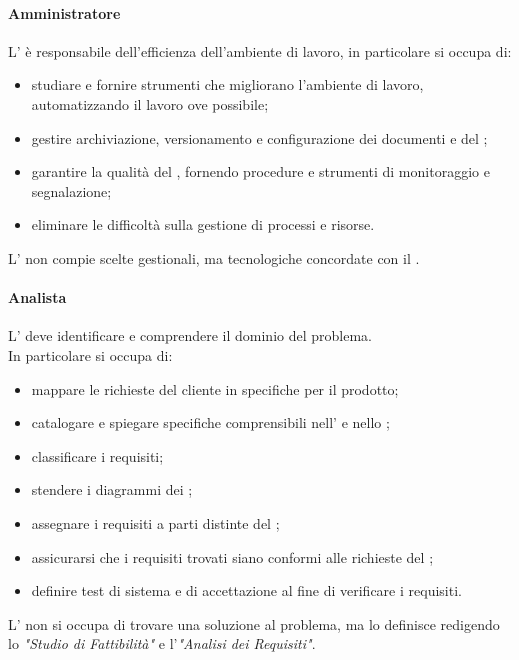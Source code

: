  \paragraph{Amministratore}
 L'\AMM{} è responsabile dell'efficienza dell'ambiente di lavoro, in particolare si occupa di:
 \begin{itemize}
  \item studiare e fornire strumenti che migliorano l'ambiente di lavoro, automatizzando il lavoro ove possibile;
  \item gestire archiviazione, versionamento e configurazione dei documenti e del ;
  \item garantire la qualità del , fornendo procedure e strumenti di monitoraggio e segnalazione;
  \item eliminare le difficoltà sulla gestione di processi e risorse.
 \end{itemize}
 L'\AMM{} non compie scelte gestionali, ma tecnologiche concordate con il \RESP.
 \paragraph{Analista}
 L'\AN{} deve identificare e comprendere il dominio del problema. \\
 In particolare si occupa di:
 \begin{itemize}
  \item mappare le richieste del cliente in specifiche per il prodotto;
  \item catalogare e spiegare specifiche comprensibili nell'\ARdoc{} e nello \SFdoc{};
  \item classificare i requisiti;
  \item stendere i diagrammi dei ;
  \item assegnare i requisiti a parti distinte del ;
  \item assicurarsi che i requisiti trovati siano conformi alle richieste del ;
  \item definire test di sistema e di accettazione al fine di verificare i requisiti.
\end{itemize}
L'\AN{} non si occupa di trovare una soluzione al problema, ma lo definisce redigendo lo \textit{"Studio di Fattibilità"} e l'\textit{"Analisi dei Requisiti"}. 

